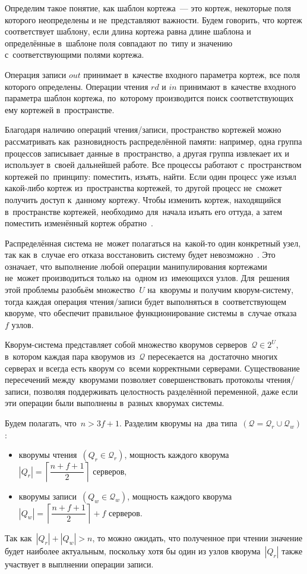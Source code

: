Определим такое понятие, как шаблон кортежа~--- это кортеж, некоторые поля которого неопределены и не~представляют важности. Будем говорить, что кортеж соответствует шаблону, если длина кортежа равна длине шаблона и определённые в~шаблоне поля совпадают по~типу и значению с~соответствующими полями кортежа.

Операция записи $out$ принимает в~качестве входного параметра кортеж, все поля которого определены. Операции чтения $rd$ и $in$ принимают в~качестве входного параметра шаблон кортежа, по~которому производится поиск соответствующих ему кортежей в~пространстве.

Благодаря наличию операций чтения/записи, пространство кортежей можно рассматривать как~разновидность распределённой памяти: например, одна группа процессов записывает данные в~пространство, а другая группа извлекает их и использует в~своей дальнейшей работе. Все процессы работают с~пространством кортежей по~принципу: поместить, изъять, найти. Если один процесс уже изъял какой-либо кортеж из~пространства кортежей, то другой процесс не~сможет получить доступ к~данному кортежу. Чтобы изменить кортеж, находящийся в~пространстве кортежей, необходимо для~начала изъять его оттуда, а затем поместить изменённый кортеж обратно~\autocite{Voevodin}.

Распределённая система не~может полагаться на~какой-то один конкретный узел, так как в~случае его отказа восстановить систему будет невозможно~\autocite{Kleppman}. Это означает, что выполнение любой операции манипулирования кортежами не~может производиться только на~одном из~имеющихся узлов. Для~решения этой проблемы разобьём множество~$U$ на~кворумы и получим кворум-систему, тогда каждая операция чтения/записи будет выполняться в~соответствующем кворуме, что обеспечит правильное функционирование системы в~случае отказа~$f$ узлов.

Кворум-система представляет собой множество кворумов серверов~$\mathcal{Q} \in 2^{U}$, в~котором каждая пара кворумов из~$\mathcal{Q}$ пересекается на~достаточно многих серверах и всегда есть кворум со~всеми корректными серверами. Существование пересечений между~кворумами позволяет совершенствовать протоколы чтения/записи, позволяя поддерживать целостность разделённой переменной, даже если эти операции были выполнены в~разных кворумах системы.

Будем полагать, что~$n > 3f + 1$. Разделим кворумы на~два типа~$(\mathcal{Q} = \mathcal{Q}_r \cup \mathcal{Q}_w)$:
\begin{itemize}
	\item кворумы чтения~$(Q_r \in \mathcal{Q}_r)$, мощность каждого кворума ~$|Q_r| = \left\lceil \dfrac{n+f+1}{2} \right\rceil$ серверов,
	\item кворумы записи~$(Q_w \in \mathcal{Q}_w)$, мощность каждого кворума~$|Q_w| = \left\lceil \dfrac{n+f+1}{2} \right\rceil + f$ серверов.
\end{itemize}
Так как~$|Q_r| + |Q_w| > n$, то можно ожидать, что полученное при чтении значение  будет наиболее актуальным, поскольку хотя бы один из узлов кворума~$|Q_r|$ также участвует в выплнении операции записи.

